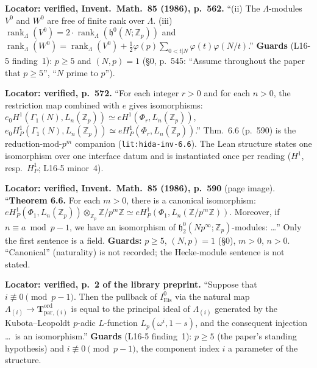 \begin{hypothesis}\label{lit:hida-inv-3.1}
   \leanok
  \textbf{Locator: verified, Invent.\ Math.\ 85 (1986), p.~562.} ``(ii) The $\Lambda$-modules $V^0$ and $W^0$ are
  free of finite rank over $\Lambda$. (iii) $\operatorname{rank}_\Lambda(V^0)=2\cdot\operatorname{rank}_\Lambda(\mathfrak{h}^0(N;\mathbb{Z}_p))$
  and $\operatorname{rank}_\Lambda(W^0)=\operatorname{rank}_\Lambda(V^0)+\tfrac12\varphi(p)\sum_{0<t|N}\varphi(t)\varphi(N/t)$.''
  \textbf{Guards} (L16-5 finding~1): $p\ge5$ and $(N,p)=1$ (\S0, p.~545: ``Assume throughout the paper that $p\ge5$'',
  ``$N$ prime to $p$'').
\end{hypothesis}

\begin{hypothesis}\label{lit:hida-inv-4.7}
   \leanok
  \textbf{Locator: verified, p.~572.} ``For each integer $r>0$ and for each $n>0$, the restriction map combined
  with $e$ gives isomorphisms: $e_0H^1(\Gamma_1(N),L_n(\mathbb{Z}_p))\simeq eH^1(\Phi_r,L_n(\mathbb{Z}_p))$,
  $e_0H^1_P(\Gamma_1(N),L_n(\mathbb{Z}_p))\simeq eH^1_P(\Phi_r,L_n(\mathbb{Z}_p))$.'' Thm.~6.6 (p.~590) is
  the reduction-mod-$p^m$ companion (\texttt{lit:hida-inv-6.6}). The Lean structure states one isomorphism over one interface
  datum and is instantiated once per reading ($H^1$, resp.\ $H^1_P$; L16-5 minor~4).
\end{hypothesis}

\begin{hypothesis}\label{lit:hida-inv-6.6}
   \leanok
  \textbf{Locator: verified, Invent.\ Math.\ 85 (1986), p.~590} (page image). ``\textbf{Theorem 6.6.} For each $m>0$, there
  is a canonical isomorphism: $eH^1_P(\Phi_1,L_n(\mathbb Z_p))\otimes_{\mathbb Z_p}\mathbb Z/p^m\mathbb Z\simeq
  eH^1_P(\Phi_1,L_n(\mathbb Z/p^m\mathbb Z))$. Moreover, if $n\equiv a\bmod p-1$, we have an isomorphism of
  $\mathfrak h^0_2(Np^\infty;\mathbb Z_p)$-modules: \dots'' Only the first sentence is a field. \textbf{Guards:} $p\ge5$,
  $(N,p)=1$ (\S0), $m>0$, $n>0$. ``Canonical'' (naturality) is not recorded; the Hecke-module sentence is not stated.
\end{hypothesis}

\begin{hypothesis}\label{lit:emerton}
   \leanok
  \textbf{Locator: verified, p.~2 of the library preprint.} ``Suppose that $i\not\equiv0\pmod{p-1}$. Then the pullback
  of $I^0_{\mathrm{Eis}}$ via the natural map $\Lambda_{(i)}\to\mathbf{T}^{\mathrm{ord}}_{\mathrm{par},(i)}$ is equal to the
  principal ideal of $\Lambda_{(i)}$ generated by the Kubota--Leopoldt $p$-adic $L$-function $L_p(\omega^i,1-s)$,
  and the consequent injection \dots\ is an isomorphism.''
  \textbf{Guards} (L16-5 finding~1): $p\ge5$ (the paper's standing hypothesis) and $i\not\equiv0\pmod{p-1}$, the component
  index $i$ a parameter of the structure.
\end{hypothesis}

